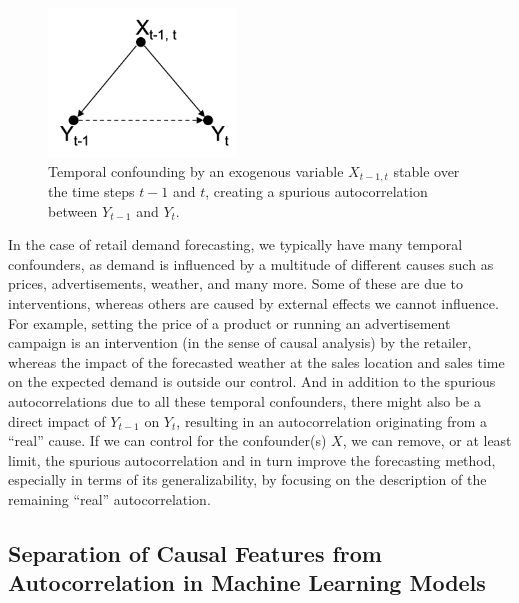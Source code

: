 \documentclass[BCOR=1mm, DIV=calc,10pt,
twoside=true,
twocolumn,
headings=normal]{scrartcl}
\begin{document}
\begin{figure}
\begin{center}
\includegraphics[width=5cm]{temporal_confounding}
\caption{\label{fig:temporal_confounding} Temporal confounding by an exogenous variable $X_{t-1, t}$ stable over the time steps $t-1$ and $t$, creating a spurious autocorrelation between $Y_{t-1}$ and $Y_t$.}
\end{center}
\end{figure}

In the case of retail demand forecasting, we typically have many temporal confounders, as demand is influenced by a multitude of different causes such as prices, advertisements, weather, and many more. Some of these are due to interventions, whereas others are caused by external effects we cannot influence. For example, setting the price of a product or running an advertisement campaign is an intervention (in the sense of causal analysis) by the retailer, whereas the impact of the forecasted weather at the sales location and sales time on the expected demand is outside our control. And in addition to the spurious autocorrelations due to all these temporal confounders, there might also be a direct impact of $Y_{t-1}$ on $Y_t$, resulting in an autocorrelation originating from a ``real'' cause. If we can control for the confounder(s) $X$, we can remove, or at least limit, the spurious autocorrelation and in turn improve the forecasting method, especially in terms of its generalizability, by focusing on the description of the remaining ``real'' autocorrelation.

\subsection{Separation of Causal Features from Autocorrelation in Machine Learning Models}
\end{document}
